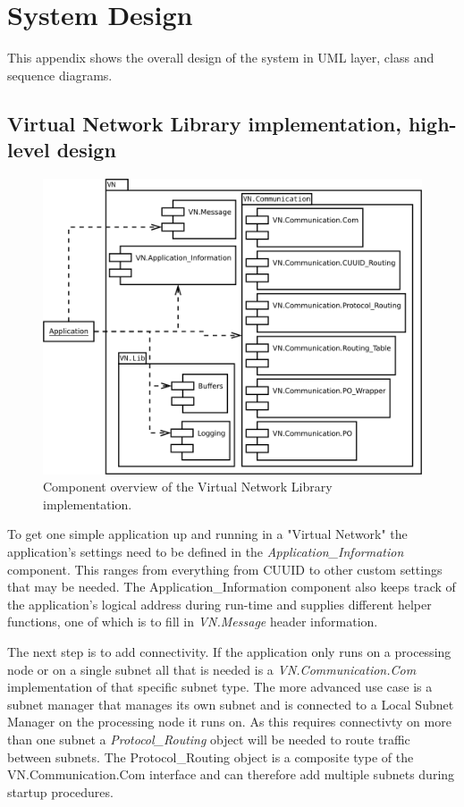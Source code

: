 \chapter{System Design}\label{ch:appendix_design}
This appendix shows the overall design of the system in UML layer, class and
sequence diagrams.

\section{Virtual Network Library implementation, high-level
design}\label{sec:layered_design}

\begin{figure}[h]
    \centering
    \includegraphics[width=\textwidth]{figures/appendix_component_overview}
    \caption{Component overview of the Virtual Network Library implementation.}
    \label{fig:appendix_component_overview}
\end{figure}

To get one simple application up and running in a "Virtual Network" the
application's settings need to be defined in the \emph{Application\_Information}
component. This ranges from everything from CUUID to other custom settings that
may be needed. The Application\_Information component also keeps track of the
application's logical address during run-time and supplies different helper
functions, one of which is to fill in \emph{VN.Message} header information.

The next step is to add connectivity. If the application only runs on a
processing node or on a single subnet all that is needed is a
\newline \emph{VN.Communication.Com} implementation of that specific subnet type. The
more advanced use case is a subnet manager that manages its own subnet and is
connected to a Local Subnet Manager on the processing node it runs on. As this
requires connectivty on more than one subnet a \emph{Protocol\_Routing} object
will be needed to route traffic between subnets. The Protocol\_Routing object
is a composite type of the VN.Communication.Com interface and can
therefore add multiple subnets during startup procedures.


